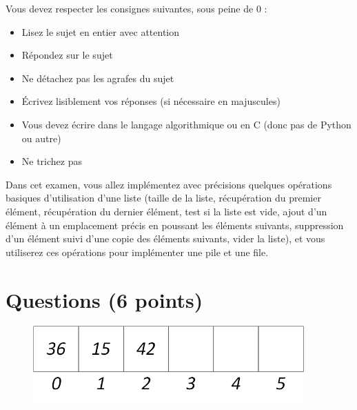 \documentclass[11pt,a4paper]{article}
\begin{document}
\MakeExamTitle                   %


\bigskip
\bigskip

Vous devez respecter les consignes suivantes, sous peine de 0 :

\begin{itemize}
\item Lisez le sujet en entier avec attention
\item Répondez sur le sujet
\item Ne détachez pas les agrafes du sujet
\item \'Ecrivez lisiblement vos réponses (si nécessaire en majuscules)
\item Vous devez écrire dans le langage algorithmique ou en C (donc pas de Python ou autre)
\item Ne trichez pas
\end{itemize}

\bigskip

\vfillFirst

Dans cet examen, vous allez implémentez avec précisions quelques opérations basiques d'utilisation d'une liste (taille de la liste, récupération du premier élément, récupération du dernier élément, test si la liste est vide, ajout d'un élément à un emplacement précis en poussant les éléments suivants, suppression d'un élément suivi d'une copie des éléments suivants, vider la liste), et vous utiliserez ces opérations pour implémenter une pile et une file.

\hspace{2cm}

\section{Questions (6 points)}

\bigskip

\begin{figure}[ht!]
\centering
\centerline{  %
\includegraphics[height=3cm]{img/Liste_t_1.png}
}
\end{figure}
\end{document}
